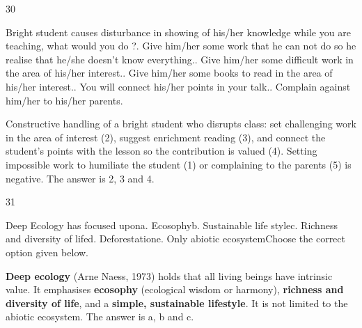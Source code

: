 \begin{question}{30}
{Bright student causes disturbance in showing of his/her knowledge while you are teaching, what would you do ?. Give him/her some work that he can not do so he realise that he/she doesn't know everything.. Give him/her some difficult work in the area of his/her interest.. Give him/her some books to read in the area of his/her interest.. You will connect his/her points in your talk.. Complain against him/her to his/her parents.\par}
\begin{explain}
Constructive handling of a bright student who disrupts class: set challenging work in the area of interest (2), suggest enrichment reading (3), and connect the student's points with the lesson so the contribution is valued (4).
Setting impossible work to humiliate the student (1) or complaining to the parents (5) is negative. The answer is 2, 3 and 4.
\end{explain}
\end{question}

\begin{question}{31}
{Deep Ecology has focused upon\newline a. Ecosophy\newline b. Sustainable life style\newline c. Richness and diversity of life\newline d. Deforestation\newline e. Only abiotic ecosystem\newline Choose the correct option given below.\par}
\begin{explain}
\textbf{Deep ecology} (Arne Naess, 1973) holds that all living beings have intrinsic value. It emphasises \textbf{ecosophy} (ecological wisdom or harmony), \textbf{richness and diversity of life}, and a \textbf{simple, sustainable lifestyle}. It is not limited to the abiotic ecosystem. The answer is a, b and c.
\end{explain}
\end{question}

